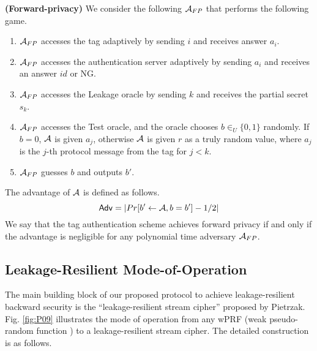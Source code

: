 \documentclass[english]{llncs}
\begin{document}
\begin{definition}
\textbf{(Forward-privacy)} We consider the following ${\cal A}_{FP}$
that performs the following game. 
\begin{enumerate}
\item ${\cal A}_{FP}$ accesses the tag adaptively by sending $i$ and receives
answer $a_{i}$. 
\item ${\cal A}_{FP}$ accesses the authentication server adaptively by
sending $a_{i}$ and receives an answer $id$ or NG. 
\item ${\cal A}_{FP}$ accesses the Leakage oracle by sending $k$ and receives
the partial secret $s_{k}$. 
\item ${\cal A}_{FP}$ accesses the Test oracle, and the oracle chooses
$b\in_{U}\{0,1\}$ randomly. If $b=0$, ${\cal A}$ is given $a_{j}$,
otherwise ${\cal A}$ is given $r$ as a truly random value, where
$a_{j}$ is the $j$-th protocol message from the tag for $j<k$. 
\item ${\cal A}_{FP}$ guesses $b$ and outputs $b'$. 
\end{enumerate}
The advantage of ${\cal A}$ is defined as follows. \[
{\sf Adv}=|Pr[b'\leftarrow{\cal A},b=b']-1/2|\]
 We say that the tag authentication scheme achieves forward privacy
if and only if the advantage is negligible for any polynomial time
adversary ${\cal A}_{FP}$. 
\end{definition}

\subsection{Leakage-Resilient Mode-of-Operation}

The main building block of our proposed protocol to achieve leakage-resilient
backward security is the {}``leakage-resilient stream cipher'' proposed
by Pietrzak\cite{P09}. Fig. \ref{fig:P09} illustrates the mode of
operation from any wPRF (weak pseudo-random function ) to a leakage-resilient
stream cipher. The detailed construction is as follows.

%
\end{document}
